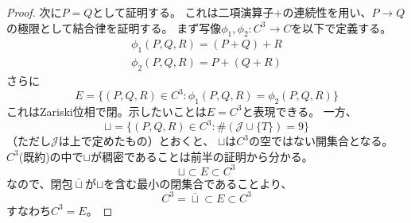 \documentclass[a4paper]{jsarticle}
\begin{document}
\begin{proof}
            次に$P=Q$として証明する。
            これは二項演算子$+$の連続性を用い、$P \to Q$の極限として結合律を証明する。
            まず写像$\phi_1, \phi_2 : C^3 \to C$を以下で定義する。
            \begin{eqnarray}
                \phi_1(P, Q, R)=(P+Q)+R \\
                \phi_2(P, Q, R)=P+(Q+R)
            \end{eqnarray}
            さらに
            \[ E=\{ (P, Q, R) \in C^3 : \phi_1(P, Q, R)=\phi_2(P, Q, R) \} \]
            これはZariski位相で閉。示したいことは$E=C^3$と表現できる。
            一方、
            \[ \sqcup=\{ (P, Q, R) \in C^3 : \#(\mathcal{J} \cup \{T\})=9 \} \]
            （ただし$\mathcal{J}$は上で定めたもの）とおくと、
            $\sqcup$は$C^3$の空ではない開集合となる。
            $C^3$(既約)の中で$\sqcup$が稠密であることは前半の証明から分かる。
            \[ \sqcup \subset E \subset C^3 \]
            なので、閉包$\bar{\sqcup}$が$\sqcup$を含む最小の閉集合であることより、
            \[ C^3=\bar{\sqcup} \subset E \subset C^3 \]
            すなわち$C^3=E$。
        \end{proof}
\end{document}
